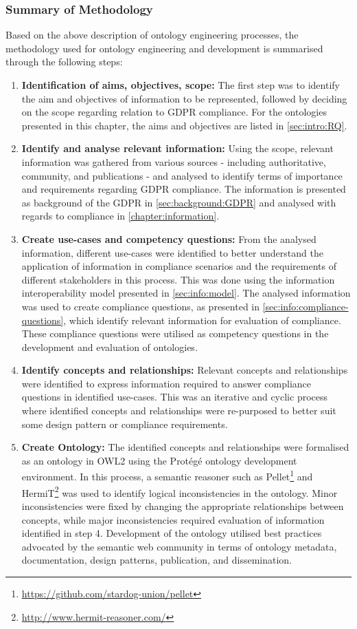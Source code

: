 \subsubsection*{Summary of Methodology}
Based on the above description of ontology engineering processes, the methodology used for ontology engineering and development is summarised through the following steps:
\begin{enumerate}
    \item \textbf{Identification of aims, objectives, scope:} The first step was to identify the aim and objectives of information to be represented, followed by deciding on the scope regarding relation to GDPR compliance. For the ontologies presented in this chapter, the aims and objectives are listed in \autoref{sec:intro:RQ}. %
    \item \textbf{Identify and analyse relevant information:} Using the scope, relevant information was gathered from various sources - including authoritative, community, and publications - and analysed to identify terms of importance and requirements regarding GDPR compliance. The information is presented as background of the GDPR in \autoref{sec:background:GDPR} and analysed with regards to compliance in \autoref{chapter:information}.
    \item \textbf{Create use-cases and competency questions:} From the analysed information, different use-cases were identified to better understand the application of information in compliance scenarios and the requirements of different stakeholders in this process. This was done using the information interoperability model presented in \autoref{sec:info:model}. The analysed information was used to create compliance questions, as presented in \autoref{sec:info:compliance-questions}, which identify relevant information for evaluation of compliance. These compliance questions were utilised as competency questions in the development and evaluation of ontologies.
    \item \textbf{Identify concepts and relationships:} Relevant concepts and relationships were identified to express information required to answer compliance questions in identified use-cases. This was an iterative and cyclic process where identified concepts and relationships were re-purposed to better suit some design pattern or compliance requirements.
    \item \textbf{Create Ontology:} The identified concepts and relationships were formalised as an ontology in OWL2 using the Protégé ontology development environment. In this process, a semantic reasoner such as Pellet\footnote{\url{https://github.com/stardog-union/pellet}} and HermiT\footnote{\url{http://www.hermit-reasoner.com/}} was used to identify logical inconsistencies in the ontology. Minor inconsistencies were fixed by changing the appropriate relationships between concepts, while major inconsistencies required evaluation of information identified in step 4. Development of the ontology utilised best practices advocated by the semantic web community in terms of ontology metadata, documentation, design patterns, publication, and dissemination.

\end{enumerate}
